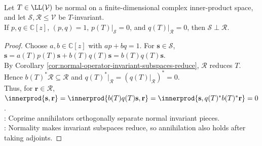 \begin{proposition} \label{prop:normal-coprime-invariant-subspaces-orthogonal} \\
Let $T\in\LL(\mathcal{V})$ be normal on a finite-dimensional complex inner-product space, and let $\mathcal{S},\mathcal{R}\leq\mathcal{V}$ be $T$-invariant.\\
If $p,q\in\mathbb{C}[z]$, $(p,q)=1$, $p(T)|_{\mathcal{S}}=0$, and $q(T)|_{\mathcal{R}}=0$, then $\mathcal{S}\perp\mathcal{R}$.
\begin{proof}
Choose $a,b\in\mathbb{C}[z]$ with $ap+bq=1$. For $\mathbf{s}\in\mathcal{S}$, $\mathbf{s}=a(T)p(T)\mathbf{s}+b(T)q(T)\mathbf{s}=b(T)q(T)\mathbf{s}$.\\
By Corollary \ref{cor:normal-operator-invariant-subspaces-reduce}, $\mathcal{R}$ reduces $T$. Hence $b(T)^*\mathcal{R}\subseteq\mathcal{R}$ and $q(T)^*|_{\mathcal{R}}=(q(T)|_{\mathcal{R}})^*=0$.\\
Thus, for $\mathbf{r}\in\mathcal{R}$, $\innerprod{\mathbf{s},\mathbf{r}} =\innerprod{b(T)q(T)\mathbf{s},\mathbf{r}} =\innerprod{\mathbf{s},q(T)^*b(T)^*\mathbf{r}} =0$.\\
: Coprime annihilators orthogonally separate normal invariant pieces.\\
: Normality makes invariant subspaces reduce, so annihilation also holds after taking adjoints.
\end{proof}
\end{proposition}

